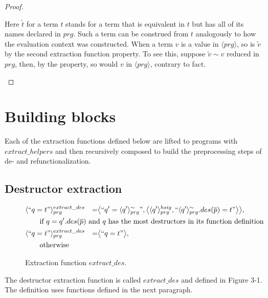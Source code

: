 \begin{proposition}
\begin{proof}
\begin{enumerate}
Here $\widetilde{t}$ for a term $t$ stands for a term that is equivalent in $t$ but has all of its names declared in $prg$. Such a term can be construed from $t$ analogously to how the evaluation context was constructed. When a term $v$ is a value in $\langle prg \rangle$, so is $\widetilde{v}$ by the second extraction function property. To see this, suppose $\widetilde{v} \sim v$ reduced in $prg$, then, by the property, so would $v$ in $\langle prg \rangle$, contrary to fact.

\end{enumerate}

\end{proof}

\end{proposition}

\section{Building blocks}

Each of the extraction functions defined below are lifted to programs with $extract\_helpers$ and then recursively composed to build the preprocessing steps of de- and refunctionalization.

\subsection{Destructor extraction}

\begin{figure}
\vspace{2.4in}
\begin{alignat*}{3}
& \langle `` q = t " \rangle^{extract\_des}_{prg} &= &\big\langle `` q' =  \langle q' \rangle^{\sim}_{prg} ", \big\langle \langle q' \rangle^{hsig}_{prg}, `` \langle q' \rangle^{\sim}_{prg}.des(\overline{p}) = t  " \big\rangle \big\rangle, \span\span \\
& \qquad \textrm{if $q = q'.des(\overline{p})$ and $q$ has the most destructors in its function definition} \span\span\span \\
& \langle `` q = t " \rangle^{extract\_des}_{prg} &= &\big\langle `` q = t " \big\rangle, \span\span \\
& \qquad \textrm{otherwise} \span\span\span
\end{alignat*}
\caption{Extraction function $extract\_des$.}
\end{figure}

The destructor extraction function is called $extract\_des$ and defined in Figure 3-1. The definition uses functions defined in the next paragraph.

